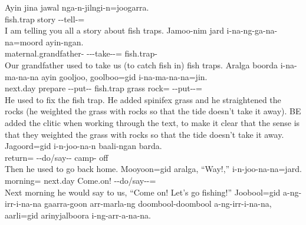 \setcounter{exxy}{0}\begin{exye}
\exy {}
\gll Ayin jina jawal nga-n-jilngi-n=joogarra.\\
fish.trap  story --tell-=\\
\ft I am telling you all a story about fish traps.
\newpage\exy {}
\gll Jamoo-nim jard i-na-ng-ga-na-na=moord ayin-ngan.\\
maternal.grandfather-  ---take--= fish.trap-\\
\ft Our grandfather used to take us (to catch fish in) fish traps.
\exy {}
\gll Aralga boorda i-na-ma-na-na ayin gooljoo, goolboo=gid i-na-ma-na-na=jin.\\
next.day prepare --put-- fish.trap grass rock= --put--=\\
\ft He used to fix the fish trap. He added spinifex grass and he straightened the rocks (he weighted the grass with rocks so that the tide doesn't take it away).
\nt BE added the clitic  when working through the text, to make it clear that the sense is that they weighted the grass with rocks so that the tide doesn't take it away.
\exy {}
\gll Jagoord=gid i-n-joo-na-n baali-ngan barda.\\
return= --do/say-- camp- off\\
\ft Then he used to go back home.
\exy {}
\gll Mooyoon=gid aralga, ``Way!,'' i-n-joo-na-na=jard.\\
morning= next.day Come.on! --do/say--=\\
\ft Next morning he would say to us, ``Come on! Let's go fishing!''
\exy {}
\gll Joobool=gid a-ng-irr-i-na-na gaarra-goon arr-marla-ng doombool-doombool a-ng-irr-i-na-na, aarli=gid arinyjalboora i-ng-arr-a-na-na.\\

\end{exye}
